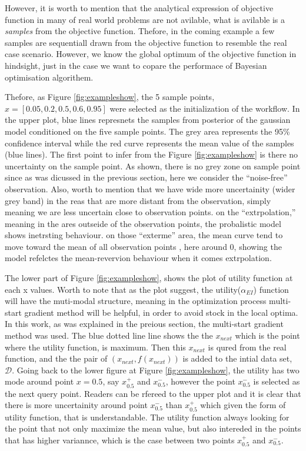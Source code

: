 \documentclass[]{elsarticle} %
\begin{document}
However, it is worth to mention that the analytical expression of objective function in many of real world problems are not avilable, what is avilable is a \emph{samples} from the objective function. Thefore, in the coming example a few samples are sequentiall drawn from the objective function to resemble the real case scenario. However, we know the global optimum of the objective function in hindsight, just in the case we want to copare the performace of Bayesian optimisation algorithem.

Thefore, as Figure \ref{fig:exampleshow}, the 5 sample points, \(x=[0.05,0.2,0.5,0.6,0.95]\) were selected as the initialization of the workflow. In the upper plot, blue lines represnets the samples from posterior of the gaussian model conditioned on the five sample points. The grey area represents the 95\% confidence interval while the red curve represents the mean value of the samples (blue lines). The first point to infer from the Figure \ref{fig:exampleshow} is there no uncertainty on the sample point. As shown, there is no grey zone on sample point since as was dicussed in the previous section, here we consider the ``noise-free'' observation. Also, worth to mention that we have wide more uncertainity (wider grey band) in the reas that are more distant from the observation, simply meaning we are less uncertain close to observation points. on the ``extrpolation,'' meaning in the ares outseide of the observation points, the probalistic model shows inetrsting behaviour. on those ``exterme'' area, the mean curve tend to move toward the mean of all observation points , here around 0, showing the model refelctes the mean-revervion behaviour when it comes extrpolation.

The lower part of Figure \ref{fig:exampleshow}, shows the plot of utility function at each x values. Worth to note that as the plot suggest, the utility(\(\alpha_{EI}\)) function will have the muti-modal structure, meaning in the optimization process multi-start gradient method will be helpful, in order to avoid stock in the local optima. In this work, as was explained in the preious section, the multi-start gradient method was used. The blue dotted line line shows the the \(x_{next}\) which is the point where the utility function, is maximum. Then this \(x_{next}\) is qured from the real function, and the the pair of \((x_{next}, f(x_{next}))\) is added to the intial data set, \(\mathcal{D}\). Going back to the lower figure at Figure \ref{fig:exampleshow}, the utility has two mode around point \(x=0.5\), say \(x_{0.5}^+\) and \(x_{0.5}^-\), however the point \(x_{0.5}^-\) is selected as the next query point. Readers can be rfereed to the upper plot and it is clear that there is more uncertainity around point \(x_{0.5}^-\) than \(x_{0.5}^+\) which given the form of utility function, that is understandable. The utility function always looking for the point that not only maximize the mean value, but also intereded in the points that has higher variannce, which is the case between two points \(x_{0.5}^+\) and \(x_{0.5}^-\).
\end{document}
